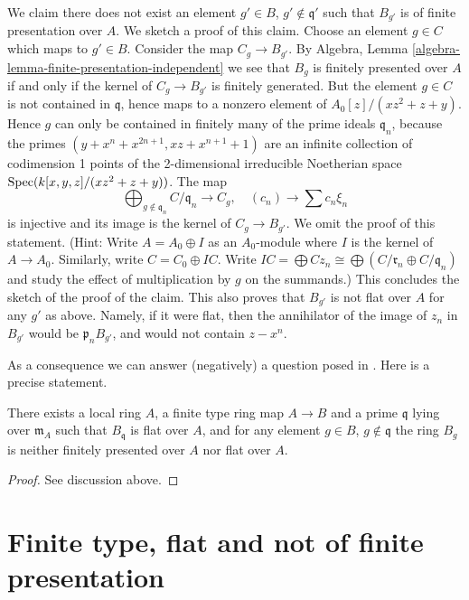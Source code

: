 \medskip\noindent
We claim there does not exist an element $g' \in B$, $g' \not \in \mathfrak q'$
such that $B_{g'}$ is of finite presentation over $A$. We sketch a proof of
this claim. Choose an element $g \in C$ which maps to $g' \in B$.
Consider the map $C_g \to B_{g'}$. By
Algebra, Lemma \ref{algebra-lemma-finite-presentation-independent}
we see that $B_g$ is finitely presented over $A$ if and only if the kernel
of $C_g \to B_{g'}$ is finitely generated. But the element $g \in C$ is
not contained in $\mathfrak q$, hence maps to a nonzero element of
$A_0[z]/(xz^2 + z + y)$. Hence $g$ can only be contained in finitely
many of the prime ideals $\mathfrak q_n$, because the primes
$(y + x^n + x^{2n + 1}, xz + x^{n + 1} + 1)$ are an infinite collection
of codimension 1 points of the 2-dimensional irreducible Noetherian space
$\mathop{\mathrm{Spec}}(k[x, y, z]/(xz^2 + z + y))$. The map
$$
\bigoplus\nolimits_{g \not \in \mathfrak q_n} C/\mathfrak q_n
\longrightarrow
C_g, \quad
(c_n) \longrightarrow \sum c_n \xi_n
$$
is injective and its image is the kernel of $C_g \to B_{g'}$. We omit the
proof of this statement. (Hint: Write $A = A_0 \oplus I$ as an $A_0$-module
where $I$ is the kernel of $A \to A_0$. Similarly, write $C = C_0 \oplus IC$.
Write
$IC = \bigoplus Cz_n \cong \bigoplus (C/\mathfrak r_n \oplus C/\mathfrak q_n)$
and study the effect of multiplication by $g$ on the summands.)
This concludes the sketch of the proof of the claim.
This also proves that $B_{g'}$ is not flat over $A$ for any $g'$ as above.
Namely, if it were flat, then the annihilator of the image of $z_n$ in
$B_{g'}$ would be $\mathfrak p_nB_{g'}$, and would not contain $z - x^n$.

\medskip\noindent
As a consequence we can answer (negatively) a question posed in
\cite[Part I, Remarques (3.4.7) ()]{GruRay}.
Here is a precise statement.

\begin{lemma}
\label{lemma-example-raynaud-gruson}
There exists a local ring $A$, a finite type ring map $A \to B$ and a prime
$\mathfrak q$ lying over $\mathfrak m_A$ such that $B_{\mathfrak q}$ is flat
over $A$, and for any element $g \in B$, $g \not \in \mathfrak q$
the ring $B_g$ is neither finitely presented over $A$ nor flat over $A$.
\end{lemma}

\begin{proof}
See discussion above.
\end{proof}


\section{Finite type, flat and not of finite presentation}
\label{section-finite-type-flat-not-finite-presentation}

